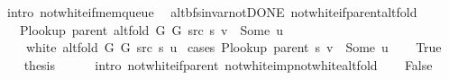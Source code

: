 \begin{isabellebody}
\ {\isacharparenleft}{\kern0pt}intro\ not{\isacharunderscore}{\kern0pt}white{\isacharunderscore}{\kern0pt}if{\isacharunderscore}{\kern0pt}mem{\isacharunderscore}{\kern0pt}queue{\isacharparenright}{\kern0pt}%
\endisatagproof
{\isafoldproof}%
%
\isadelimproof
\isanewline
%
\endisadelimproof
%
\isadeliminvisible
\isanewline
%
\endisadeliminvisible
%
\isataginvisible
{}\isamarkupfalse%
\ {\isacharparenleft}{\kern0pt}\ alt{\isacharunderscore}{\kern0pt}bfs{\isacharunderscore}{\kern0pt}invar{\isacharunderscore}{\kern0pt}not{\isacharunderscore}{\kern0pt}DONE{\isacharparenright}{\kern0pt}\ not{\isacharunderscore}{\kern0pt}white{\isacharunderscore}{\kern0pt}if{\isacharunderscore}{\kern0pt}parent{\isacharunderscore}{\kern0pt}alt{\isacharunderscore}{\kern0pt}fold{\isacharcolon}{\kern0pt}\isanewline
\ \ \ {\isachardoublequoteopen}P{\isacharunderscore}{\kern0pt}lookup\ {\isacharparenleft}{\kern0pt}parent\ {\isacharparenleft}{\kern0pt}alt{\isacharunderscore}{\kern0pt}fold\ G{}\ G{}\ src\ s{\isacharparenright}{\kern0pt}{\isacharparenright}{\kern0pt}\ v\ {\isacharequal}{\kern0pt}\ Some\ u{\isachardoublequoteclose}\isanewline
\ \ \ {\isachardoublequoteopen}{\isasymnot}\ white\ {\isacharparenleft}{\kern0pt}alt{\isacharunderscore}{\kern0pt}fold\ G{}\ G{}\ src\ s{\isacharparenright}{\kern0pt}\ u{\isachardoublequoteclose}%
\endisataginvisible
{\isafoldinvisible}%
%
\isadeliminvisible
\isanewline
%
\endisadeliminvisible
%
\isadelimproof
%
\endisadelimproof
%
\isatagproof
{}\isamarkupfalse%
\ {\isacharparenleft}{\kern0pt}cases\ {\isachardoublequoteopen}P{\isacharunderscore}{\kern0pt}lookup\ {\isacharparenleft}{\kern0pt}parent\ s{\isacharparenright}{\kern0pt}\ v\ {\isacharequal}{\kern0pt}\ Some\ u{\isachardoublequoteclose}{\isacharparenright}{\kern0pt}\isanewline
\ \ \isamarkupfalse%
\ True\isanewline
\ \ \isamarkupfalse%
\ {\isacharquery}{\kern0pt}thesis\isanewline
\ \ \ \ \isamarkupfalse%
\ {\isacharparenleft}{\kern0pt}intro\ not{\isacharunderscore}{\kern0pt}white{\isacharunderscore}{\kern0pt}if{\isacharunderscore}{\kern0pt}parent\ not{\isacharunderscore}{\kern0pt}white{\isacharunderscore}{\kern0pt}imp{\isacharunderscore}{\kern0pt}not{\isacharunderscore}{\kern0pt}white{\isacharunderscore}{\kern0pt}alt{\isacharunderscore}{\kern0pt}fold{\isacharparenright}{\kern0pt}\isanewline
{}\isamarkupfalse%
\isanewline
\ \ \isamarkupfalse%
\ False\isanewline
\ \ \isamarkupfalse%

\end{isabellebody}
